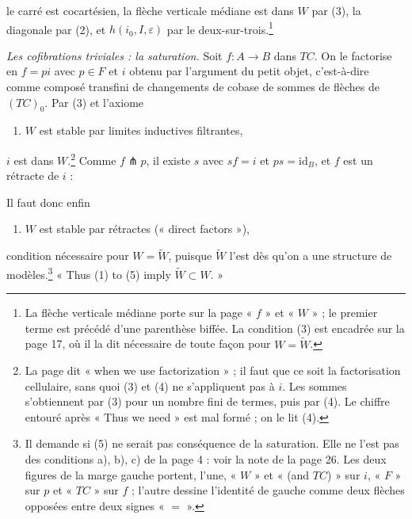 \documentclass[11pt,a4paper]{article}
\begin{document}

le carré est cocartésien, la flèche verticale médiane est dans $W$ par (3), la
diagonale par (2), et $h(i_0, I, \varepsilon)$ par le
deux-sur-trois.\footnote{La flèche verticale médiane porte sur la page
« $f$ » et « $W$ » ; le premier terme est précédé d'une parenthèse biffée. La
condition (3) est encadrée sur la page 17, où il la dit nécessaire de toute
façon pour $W = \widetilde W$.}

\emph{Les cofibrations triviales : la saturation.} Soit $f : A \to B$ dans
$TC$. On le factorise en $f = pi$ avec $p \in F$ et $i$ obtenu par l'argument
du petit objet, c'est-à-dire comme composé transfini de changements de cobase
de sommes de flèches de $(TC)_0$. Par (3) et l'axiome
\begin{enumerate}
\item[(4)] $W$ est stable par limites inductives filtrantes,
\end{enumerate}
$i$ est dans $W$.\footnote{La page dit « when we use factorization » ; il faut
que ce soit la factorisation cellulaire, sans quoi (3) et (4) ne s'appliquent pas
à $i$. Les sommes s'obtiennent par (3) pour un nombre fini de termes, puis par
(4). Le chiffre entouré après « Thus we need » est mal formé ; on le lit (4).}
Comme $f \pitchfork p$, il existe $s$ avec $sf = i$ et $ps = \mathrm{id}_B$,
et $f$ est un rétracte de $i$ :


Il faut donc enfin
\begin{enumerate}
\item[(5)] $W$ est stable par rétractes (« direct factors »),
\end{enumerate}
condition nécessaire pour $W = \widetilde W$, puisque $\widetilde W$ l'est
dès qu'on a une structure de modèles.\footnote{Il demande si (5) ne serait pas
conséquence de la saturation. Elle ne l'est pas des conditions a), b), c) de
la page 4 : voir la note de la page 26. Les deux figures de la marge gauche
portent, l'une, « $W$ » et « (and $TC$) » sur $i$, « $F$ » sur $p$ et
« $TC$ » sur $f$ ; l'autre dessine l'identité de gauche comme deux flèches
opposées entre deux signes « $=$ ».} « Thus (1) to (5) imply $\widetilde W \subset W$. »
\end{document}
